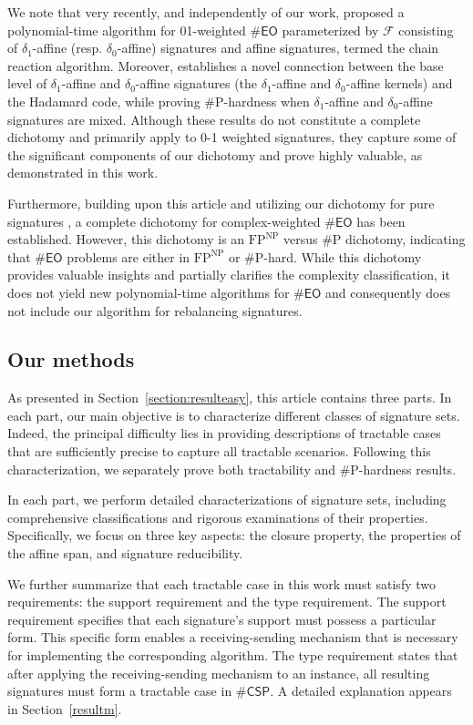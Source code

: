 \documentclass[a4paper,UKenglish,cleveref, autoref, thm-restate]{lipics-v2021}
\newcommand{\eo}[0]{\textsf{EO}}
\newcommand{\csp}[0]{\textsf{CSP}}
\begin{document}
We note that very recently, and independently of our work, \cite{shao2024eulerian} proposed a polynomial-time algorithm for 01-weighted $\#\eo$ parameterized by $\mathcal{F}$ consisting of $\delta_1$-affine (resp. $\delta_0$-affine) signatures and affine signatures, termed the chain reaction algorithm. Moreover, \cite{shao2024eulerian} establishes a novel connection between the base level of $\delta_1$-affine and $\delta_0$-affine signatures (the $\delta_1$-affine and $\delta_0$-affine kernels) and the Hadamard code, while proving \#P-hardness when $\delta_1$-affine and $\delta_0$-affine signatures are mixed. Although these results do not constitute a complete dichotomy and primarily apply to 0-1 weighted signatures, they capture some of the significant components of our dichotomy and prove highly valuable, as demonstrated in this work.

Furthermore, building upon this article and utilizing our dichotomy for pure signatures \cite{meng2025fpnp}, a complete dichotomy for complex-weighted $\#\eo$ has been established. However, this dichotomy is an $\text{FP}^\text{NP}$ versus \#P dichotomy, indicating that $\#\eo$ problems are either in $\text{FP}^\text{NP}$ or \#P-hard. While this dichotomy provides valuable insights and partially clarifies the complexity classification, it does not yield new polynomial-time algorithms for $\#\eo$ and consequently does not include our algorithm for rebalancing signatures.

\subsection{Our methods}
As presented in Section~\ref{section:resulteasy}, this article contains three parts. In each part, our main objective is to characterize different classes of signature sets. Indeed, the principal difficulty lies in providing descriptions of tractable cases that are sufficiently precise to capture all tractable scenarios. Following this characterization, we separately prove both tractability and \#P-hardness results.

In each part, we perform detailed characterizations of signature sets, including comprehensive classifications and rigorous examinations of their properties. Specifically, we focus on three key aspects: the closure property, the properties of the affine span, and signature reducibility.

We further summarize that each tractable case in this work must satisfy two requirements: the support requirement and the type requirement. The support requirement specifies that each signature's support must possess a particular form. This specific form enables a receiving-sending mechanism that is necessary for implementing the corresponding algorithm. The type requirement states that after applying the receiving-sending mechanism to an instance, all resulting signatures must form a tractable case in $\#\csp$. A detailed explanation appears in Section~\ref{resultm}.
\end{document}
